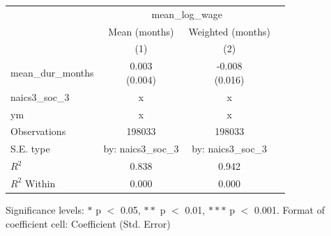 \renewcommand\cellalign{t}
\begin{threeparttable}
\begin{tabular}{lccc}
\toprule
 & \multicolumn{2}{c}{mean_log_wage} \\
\cmidrule(lr){2-3} 
 & Mean (months) & Weighted (months) \\
 & (1) & (2) \\
\midrule
\addlinespace
mean_dur_months & \makecell{0.003 \\ (0.004)} & \makecell{-0.008 \\ (0.016)} \\
\midrule
\addlinespace
naics3_soc_3 & x & x \\
ym & x & x \\
\midrule
\addlinespace
Observations & 198033 & 198033 \\
S.E. type & by: naics3_soc_3 & by: naics3_soc_3 \\
$R^2$ & 0.838 & 0.942 \\
$R^2$ Within & 0.000 & 0.000 \\
\bottomrule
\end{tabular}
\footnotesize Significance levels: $*$ p $<$ 0.05, $**$ p $<$ 0.01, $***$ p $<$ 0.001. Format of coefficient cell: Coefficient 
 (Std. Error)
\end{threeparttable}
